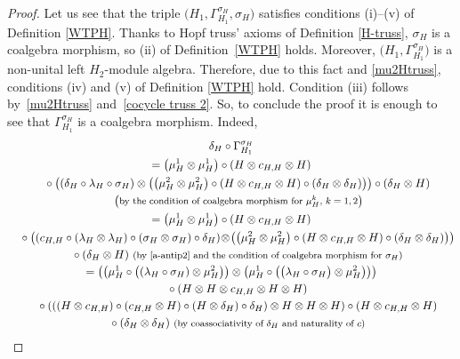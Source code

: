 \documentclass[10pt,a4paper]{amsart}
\numberwithin{equation}{section}
\begin{document}
\begin{proof} Let us see that the triple $\bigl(H_{1},\Gamma_{H_{1}}^{\sigma_{H}},\sigma_{H}\bigr)$ satisfies conditions (i)--(v) of Definition \ref{WTPH}. Thanks to Hopf truss' axioms of Definition \ref{H-truss}, $\sigma_{H}$ is a coalgebra morphism, so (ii) of Definition~\ref{WTPH} holds. Moreover, $\bigl(H_{1}, \Gamma_{H_{1}}^{\sigma_{H}}\bigr)$ is a non-unital left $H_{2}$-module algebra. Therefore, due to this fact and \eqref{mu2Htruss}, conditions (iv) and (v) of Definition \ref{WTPH} hold. Condition (iii) follows by~\eqref{mu2Htruss} and~\eqref{cocycle truss 2}. So, to conclude the proof it is enough to see that $\Gamma_{H_{1}}^{\sigma_{H}}$ is a coalgebra morphism. Indeed,
\begin{gather*}
 \delta_{H}\circ\Gamma_{H_{1}}^{\sigma_{H}} \\
 =\bigl(\mu_{H}^{1}\otimes\mu_{H}^{1}\bigr)\circ(H\otimes c_{H,H}\otimes H) \\
 \quad{} \circ\bigl((\delta_{H}\circ\lambda_{H}\circ\sigma_{H})\otimes\bigl(\bigl(\mu_{H}^{2}\otimes\mu_{H}^{2}\bigr)\circ(H\otimes c_{H,H}\otimes H)\circ(\delta_{H}\otimes\delta_{H})\bigr)\bigr)\circ(\delta_{H}\otimes H)\\
 \quad{}\;\text{\footnotesize\textnormal{\big(by the condition of coalgebra morphism for $\mu_{H}^{k}$, $k=1,2$\big)}} \\
 =\bigl(\mu_{H}^{1}\otimes\mu_{H}^{1}\bigr)\circ(H\otimes c_{H,H}\otimes H)\\
 \quad{}\circ\bigl((c_{H,H}\circ(\lambda_{H}\otimes\lambda_{H})\circ(\sigma_{H}\otimes\sigma_{H})\circ\delta_{H})\!\otimes\!\bigl(\bigl(\mu_{H}^{2}\otimes\mu_{H}^{2}\bigr)
\circ(H\otimes c_{H,H}\otimes H)\circ (\delta_{H}\otimes\delta_{H})\bigr)\bigr)\\
 \quad{}\circ(\delta_{H}\otimes H)\ \text{\footnotesize\textnormal{(by \eqref{a-antip2} and the condition of coalgebra morphism for $\sigma_{H}$)}} \\ =\bigl(\bigl(\mu_{H}^{1}\circ\bigl((\lambda_{H}\circ\sigma_{H})\otimes\mu_{H}^{2}\bigr)\bigr)\otimes\bigl(\mu_{H}^{1}\circ\bigl(\bigl(\lambda_{H}\circ\sigma_{H}\bigr)\otimes\mu_{H}^{2}\bigr)\bigr)\bigr)\\
 \quad{}\circ(H\otimes H\otimes c_{H,H}\otimes H\otimes H) \\
 \quad{}\circ(((H\otimes c_{H,H})\circ(c_{H,H}\otimes H)\circ(H\otimes\delta_{H})\circ\delta_{H})\otimes H\otimes H\otimes H)\circ(H\otimes c_{H,H}\otimes H)\\
 \quad{}\circ(\delta_{H}\otimes\delta_{H})\ \text{\footnotesize\textnormal{(by coassociativity of $\delta_{H}$ and naturality of $c$)}} \\

\end{gather*}
\end{proof}
\end{document}
